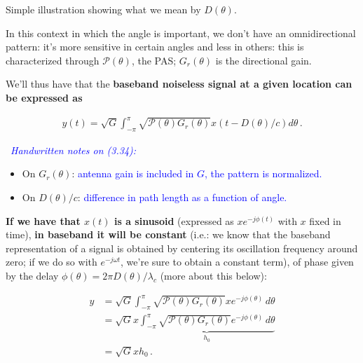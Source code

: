 \documentclass[a4paper, 12pt]{book}
\begin{document}
\begin{greenbar}
Simple illustration showing what we mean by $D(\theta)$.
\end{greenbar}

In this context in which the angle is important, we don't have an omnidirectional pattern: it's more sensitive in certain angles and less in others: this is characterized through $\mathcal{P}(\theta)$, the \textcolor{green!60!black}{PAS}; $G_r(\theta)$ is the directional gain.

We'll thus have that the \textbf{baseband noiseless signal at a given location can be expressed as}

\begin{align}
y(t) = \sqrt{G} \int_{-\pi}^{\pi} \sqrt{\mathcal{P}(\theta) G_r(\theta)} x(t - D(\theta)/c) d\theta \,. \tag{3.34}
\end{align}

\begin{center}
    \footnotesize \textcolor{blue}{\faPen\ \textit{Handwritten notes on (3.34):}} \\
    \begin{itemize}
        \item On $G_r(\theta)$: \textcolor{blue}{antenna gain is included in $G$, the pattern is normalized.}
        \item On $D(\theta)/c$: \textcolor{blue}{difference in path length as a function of angle.}
    \end{itemize}
\end{center}

\textbf{If we have that $x(t)$ is a sinusoid} (expressed as $x e^{-j\phi(t)}$ with $x$ fixed in time), \textbf{in baseband it will be constant} (i.e.: we know that the baseband representation of a signal is obtained by centering its oscillation frequency around zero; if we do so \colorbox{yellow!20}{with $e^{-j\omega t}$}, we're \colorbox{yellow!20}{sure to obtain a constant term}), of phase given by the delay $\phi(\theta) = 2\pi D(\theta)/\lambda_c$ (more about this below):

\begin{align}
y &= \sqrt{G} \int_{-\pi}^{\pi} \sqrt{\mathcal{P}(\theta)G_r(\theta)} x e^{-j\phi(\theta)} \, d\theta \tag{3.35} \\
&= \sqrt{G}x \underbrace{\int_{-\pi}^{\pi} \sqrt{\mathcal{P}(\theta)G_r(\theta)} e^{-j\phi(\theta)} \, d\theta}_{h_0} \tag{3.36} \\
&= \sqrt{G} x h_0 \,. \nonumber
\end{align}
\end{document}
